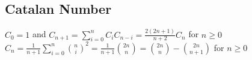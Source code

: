 \subsection{Catalan Number}
$C_{0}=1$ and $C_{n+1}=\sum_{i=0}^{n}C_{i}C_{n-i}=\frac{2(2n+1)}{n+2}C_{n}$ for $n\ge0$\\
$C_{n}=\frac{1}{n+1}\sum_{i=0}^{n}\binom{n}{i}^{2}=\frac{1}{n+1}\binom{2n}{n}=\binom{2n}{n}-\binom{2n}{n+1}$ for $n\ge0$

